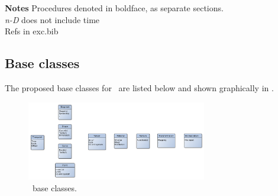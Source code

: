 \textbf{Notes} Procedures denoted in boldface, as separate sections.\\
\emph{n-D} does not include time\\
Refs \cite{sciplan} in exc.bib

\subsection{Base classes}\label{sec:base-classes}
The proposed base classes for \nep\ are listed below and shown graphically in .
\begin{figure}
\centerline{\includegraphics[width=0.7\textwidth]{./pics/baseclasses.png}}
\caption{\nep \ base classes.
\label{fig:baseclasses}}
\end{figure}

